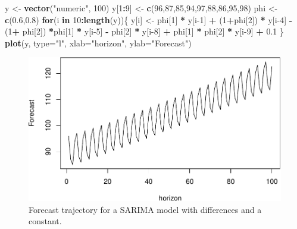 \documentclass[]{book}
\newenvironment{Shaded}{\begin{snugshade}}{\end{snugshade}}
\newcommand{\ControlFlowTok}[1]{\textcolor[rgb]{0.13,0.29,0.53}{\textbf{#1}}}
\newcommand{\DataTypeTok}[1]{\textcolor[rgb]{0.13,0.29,0.53}{#1}}
\newcommand{\DecValTok}[1]{\textcolor[rgb]{0.00,0.00,0.81}{#1}}
\newcommand{\FloatTok}[1]{\textcolor[rgb]{0.00,0.00,0.81}{#1}}
\newcommand{\KeywordTok}[1]{\textcolor[rgb]{0.13,0.29,0.53}{\textbf{#1}}}
\newcommand{\NormalTok}[1]{#1}
\newcommand{\OperatorTok}[1]{\textcolor[rgb]{0.81,0.36,0.00}{\textbf{#1}}}
\newcommand{\StringTok}[1]{\textcolor[rgb]{0.31,0.60,0.02}{#1}}
\theoremstyle{definition}
\theoremstyle{definition}
\theoremstyle{definition}
\theoremstyle{definition}
\theoremstyle{remark}
\begin{document}
\begin{Shaded}
\begin{Highlighting}[]
\NormalTok{y <-}\StringTok{ }\KeywordTok{vector}\NormalTok{(}\StringTok{"numeric"}\NormalTok{, }\DecValTok{100}\NormalTok{)}
\NormalTok{y[}\DecValTok{1}\OperatorTok{:}\DecValTok{9}\NormalTok{] <-}\StringTok{ }\KeywordTok{c}\NormalTok{(}\DecValTok{96}\NormalTok{,}\DecValTok{87}\NormalTok{,}\DecValTok{85}\NormalTok{,}\DecValTok{94}\NormalTok{,}\DecValTok{97}\NormalTok{,}\DecValTok{88}\NormalTok{,}\DecValTok{86}\NormalTok{,}\DecValTok{95}\NormalTok{,}\DecValTok{98}\NormalTok{)}
\NormalTok{phi <-}\StringTok{ }\KeywordTok{c}\NormalTok{(}\FloatTok{0.6}\NormalTok{,}\FloatTok{0.8}\NormalTok{)}
\ControlFlowTok{for}\NormalTok{(i }\ControlFlowTok{in} \DecValTok{10}\OperatorTok{:}\KeywordTok{length}\NormalTok{(y))\{}
\NormalTok{    y[i] <-}\StringTok{ }\NormalTok{phi[}\DecValTok{1}\NormalTok{] }\OperatorTok{*}\StringTok{ }\NormalTok{y[i}\DecValTok{-1}\NormalTok{] }\OperatorTok{+}\StringTok{ }\NormalTok{(}\DecValTok{1}\OperatorTok{+}\NormalTok{phi[}\DecValTok{2}\NormalTok{]) }\OperatorTok{*}\StringTok{ }\NormalTok{y[i}\DecValTok{-4}\NormalTok{] }\OperatorTok{-}
\StringTok{      }\NormalTok{(}\DecValTok{1}\OperatorTok{+}\StringTok{ }\NormalTok{phi[}\DecValTok{2}\NormalTok{]) }\OperatorTok{*}\NormalTok{phi[}\DecValTok{1}\NormalTok{] }\OperatorTok{*}\StringTok{ }\NormalTok{y[i}\DecValTok{-5}\NormalTok{] }\OperatorTok{-}\StringTok{ }\NormalTok{phi[}\DecValTok{2}\NormalTok{] }\OperatorTok{*}\StringTok{ }\NormalTok{y[i}\DecValTok{-8}\NormalTok{] }\OperatorTok{+}
\StringTok{      }\NormalTok{phi[}\DecValTok{1}\NormalTok{] }\OperatorTok{*}\StringTok{ }\NormalTok{phi[}\DecValTok{2}\NormalTok{] }\OperatorTok{*}\StringTok{ }\NormalTok{y[i}\DecValTok{-9}\NormalTok{] }\OperatorTok{+}\StringTok{ }\FloatTok{0.1}
\NormalTok{\}}
\KeywordTok{plot}\NormalTok{(y, }\DataTypeTok{type=}\StringTok{"l"}\NormalTok{, }\DataTypeTok{xlab=}\StringTok{"horizon"}\NormalTok{, }\DataTypeTok{ylab=}\StringTok{"Forecast"}\NormalTok{)}
\end{Highlighting}
\end{Shaded}

\begin{figure}
\centering
\includegraphics{Svetunkov--2022----ADAM_files/figure-latex/SARIMADiffConstantTrajectory-1.pdf}
\caption{\label{fig:SARIMADiffConstantTrajectory}Forecast trajectory for a SARIMA model with differences and a constant.}
\end{figure}
\end{document}
